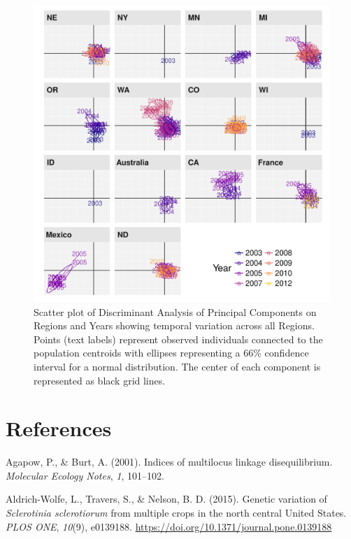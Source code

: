 \documentclass[fleqn,10pt,lineno]{wlpeerj} %
\theoremstyle{definition}
\theoremstyle{definition}
\theoremstyle{definition}
\theoremstyle{remark}
\begin{document}
\begin{figure}
\centering
\includegraphics[width=1.00000\textwidth]{../../results/figures/publication/dapc_region_year.pdf}
\caption{Scatter plot of Discriminant Analysis of Principal Components
on Regions and Years showing temporal variation across all Regions.
Points (text labels) represent observed individuals connected to the
population centroids with ellipses representing a 66\% confidence
interval for a normal distribution. The center of each component is
represented as black grid lines.}\label{DAPC-RY-FULL}
\end{figure}

\newpage

\section*{References}\label{references}

\hypertarget{refs}{}
\hypertarget{ref-agapow2001indices}{}
Agapow, P., \& Burt, A. (2001). Indices of multilocus linkage
disequilibrium. \emph{Molecular Ecology Notes}, \emph{1}, 101--102.

\hypertarget{ref-aldrich-wolfe2015genetic}{}
Aldrich-Wolfe, L., Travers, S., \& Nelson, B. D. (2015). Genetic
variation of \emph{Sclerotinia sclerotiorum} from multiple crops in the
north central United States. \emph{PLOS ONE}, \emph{10}(9), e0139188.
\url{https://doi.org/10.1371/journal.pone.0139188}
\end{document}
